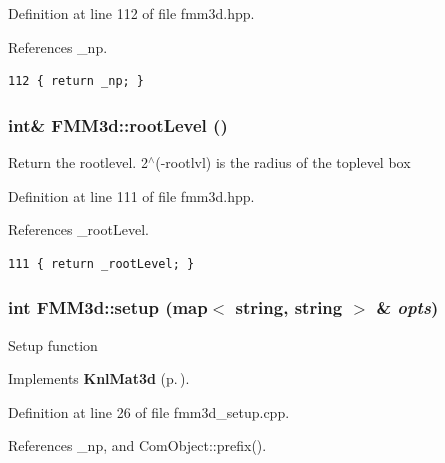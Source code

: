 Definition at line 112 of file fmm3d.hpp.

References \_\-np.

\footnotesize\begin{verbatim}112 { return _np; }  
\end{verbatim}\normalsize 


\subsubsection{\setlength{\rightskip}{0pt plus 5cm}int\& FMM3d::root\-Level ()\hspace{0.3cm}{\tt  [inline]}}\label{classFMM3d_f80fcb36cb42936f1912fe8c85ec96e4_f80fcb36cb42936f1912fe8c85ec96e4}


Return the rootlevel. 2$^\wedge$(-rootlvl) is the radius of the toplevel box 

Definition at line 111 of file fmm3d.hpp.

References \_\-root\-Level.

\footnotesize\begin{verbatim}111 { return _rootLevel; }
\end{verbatim}\normalsize 


\subsubsection{\setlength{\rightskip}{0pt plus 5cm}int FMM3d::setup (map$<$ string, string $>$ \& {\em opts})\hspace{0.3cm}{\tt  [virtual]}}\label{classFMM3d_d134e155a30bcbea9ad038ffcd737ddc_d134e155a30bcbea9ad038ffcd737ddc}


Setup function 

Implements {\bf Knl\-Mat3d} {\rm (p.\,\pageref{classKnlMat3d_24cbbecf677cd909a522d252feebf2c6_24cbbecf677cd909a522d252feebf2c6})}.

Definition at line 26 of file fmm3d\_\-setup.cpp.

References \_\-np, and Com\-Object::prefix().

